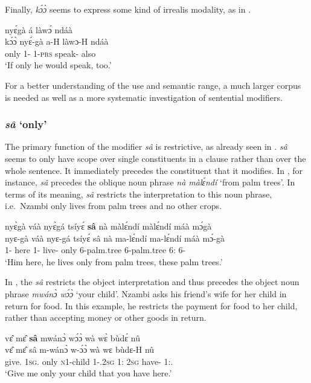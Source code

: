 Finally, {\itshape kɔ́ɔ̀} seems to express some kind of irrealis modality, as in .

\ea \label{koo8}
   nyɛ́gà á làwɔ́ ndáà \\
         kɔ́ɔ̀ nyɛ́-gà a-H làwɔ-H ndáà \\
         only 1-{\CONTR} 1-\textsc{prs} speak-{\R} also\\
    \trans `If only he would speak, too.'
\z


\noindent For a better understanding of the use and semantic range, a much larger corpus is needed as well as a more systematic investigation of sentential modifiers.




\subsubsection*{{\itshape sâ} `only'}
The primary function of the modifier {\itshape sâ} is restrictive, as already seen in . {\itshape sâ} seems to only have scope over single constituents in a clause rather than over the whole sentence. It immediately precedes the constituent that it modifies. In , for instance, {\itshape sâ} precedes the oblique noun phrase {\itshape nà màlɛ́ndí} `from palm trees'. In terms of its meaning, {\itshape sâ} restricts the interpretation to this noun phrase, i.e.\ Nzambi only lives from palm trees and no other crops.

\ea \label{sa1}
  \glll nyɛ̀gà váà nyɛ̀gá tsíyɛ́ {\bfseries sâ} nà màlɛ́ndí màlɛ́ndí máà mɔ́gà \\
         nyɛ-gà váà nyɛ-gá tsíyɛ́ sâ nà ma-lɛ́ndí ma-lɛ́ndí máà mɔ́-gà \\
          1-{\CONTR} here 1-{\CONTR} live-{\R} only {\COM} 6-palm.tree 6-palm.tree 6:{\DEM} 6-{\CONTR} \\
    \trans `Him here, he lives only from palm trees, these palm trees.'
\z

In , the {\itshape sâ} restricts the object interpretation and thus precedes the object noun phrase {\itshape mwánɔ̀ wɔ́ɔ̀} `your child'. Nzambi asks his friend's wife for her child in return for food. In this example, he restricts the payment for food to her child, rather than accepting money or other goods in return.

\ea \label{sa2}
  \glll  vɛ̂ mɛ̂ {\bfseries sâ} mwánɔ̀ wɔ́ɔ̀ wà wɛ̀ bùdɛ́ nû \\
         vɛ̂ mɛ̂ sâ m-wánɔ̀ w-ɔ́ɔ̀ wà wɛ bùdɛ-H nû \\
          give.{\IMP} 1\textsc{sg}.{\OBJ} only \textsc{n}1-child 1-{\POSS}.2\textsc{sg} 1:{\ATT} 2\textsc{sg} have-{\R} 1:{\DEM}.{\PROX} \\
    \trans `Give me only your child that you have here.'
\z

